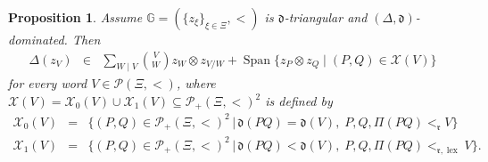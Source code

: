 \documentclass{article}
\theoremstyle{plain}
\newtheorem{prop}[thm]{Proposition}
\theoremstyle{definition}
\numberwithin{equation}{section}
\DeclareMathOperator{\Span}{Span}
\DeclareMathOperator{\lex}{lex}
\newcommand{\PP}{\mathcal{P}}
\newcommand{\GG}{\mathbb{G}}
\newcommand{\dd}{\mathfrak{d}}
\newcommand{\rr}{\mathfrak{r}}
\begin{document}
	\begin{prop}\label{comultiplication}
		Assume $\GG=(\{z_\xi\}_{\xi \in\Xi},<)$ is $\dd$-triangular and $(\Delta,\dd)$-dominated. Then
		\begin{eqnarray*}
			\Delta(z_{V}) & \in &  \sum_{W\mid V}\binom{V}{W}z_{W} \otimes z_{V/W} + \Span\{z_{P}\otimes z_{Q} \mid (P,Q) \in \mathcal{X}(V)\}
		\end{eqnarray*}
		for every word $V\in \PP(\Xi, <)$, where $\mathcal{X}(V) = \mathcal{X}_{0}(V)\cup \mathcal{X}_{1}(V) \subseteq  \PP_{+}(\Xi,<)^{2}$ is defined by
		\begin{eqnarray*}
			\mathcal{X}_{0}(V) &=& \big\{ (P,Q) \in \PP_{+}(\Xi,<)^{2} \,\big|\,  \dd(PQ) = \dd(V),\; P, Q, \Pi(PQ)<_{\rr} V \big\}\\
			\mathcal{X}_{1}(V) &=& \big\{ (P,Q) \in \PP_{+}(\Xi,<)^{2} \,\big|\, \dd(PQ) < \dd(V),\; P, Q, \Pi(PQ) <_{\rr,\lex}V \big\}.
		\end{eqnarray*}
	\end{prop}
	
\end{document}
